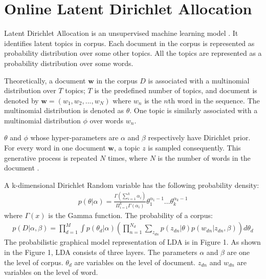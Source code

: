 \documentclass{article} %
\begin{document}
    \section{Online Latent Dirichlet Allocation}
    Latent Dirichlet Allocation is an unsupervised machine learning model \cite{blei_latent_2003}. It identifies latent topics in corpus. Each document in the corpus is represented as probability distribution over some other topics. All the topics are represented as a probability distribution over some words.

    Theoretically, a document $\bm{w}$ in the corpus $D$ is associated with a multinomial distribution over $T$ topics; $T$ is the predefined number of topics, and document is denoted by $\bm{w} = (w_1, w_2, ..., w_N)$ where $w_n$ is the $n$th word in the sequence. The multinomial distribution is denoted as $\theta$. One topic is similarly associated with a multinomial distribution $\phi$ over words $w_n$.

    $\theta$ and $\phi$ whose hyper-parameters are $\alpha$ and $\beta$ respectively have Dirichlet prior. For every word in one document $\bm{w}$, a topic $z$ is sampled consequently. This generative process is repeated $N$ times, where $N$ is the number of words in the document \cite{hong_empirical_2010}.

    A k-dimensional Dirichlet Random variable has the following probability density:
    \begin{align}
        p(\theta|\alpha) = \frac{\Gamma(\sum_{i=1}^{k} \alpha_i)}{\Pi_{i=1}^{k}\Gamma(\alpha_i)}\theta_{1}^{\alpha_{1}-1}\dots\theta_{k}^{\alpha_{k}-1}
    \end{align}
    where $\Gamma(x)$ is the Gamma function.
    The probability of a corpus:
    \begin{align}
        p(D|\alpha, \beta) = \displaystyle \prod_{d=1}^{M}\int p(\theta_{d}|\alpha) \left( \displaystyle  \prod_{n=1}^{N_d}\sum_{z_{dn}}p(z_{dn}|\theta)p(w_{dn}|z_{dn}, \beta) \right)d\theta_d
    \end{align}
    The probabilistic graphical model representation of LDA is in Figure 1. As shown in the Figure 1, LDA consists of three layers. The parameters $\alpha$ and $\beta$ are one the level of corpus. $\theta_{d}$ are variables on the level of document. $z_{dn}$ and $w_{dn}$ are variables on the level of word.
\end{document}
